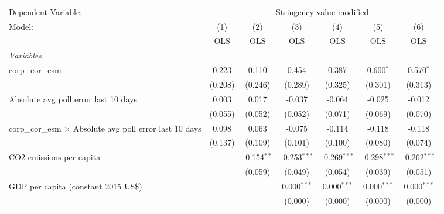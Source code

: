 
\begingroup
\centering
\begin{tabular}{lcccccc}
   \toprule
   Dependent Variable: & \multicolumn{6}{c}{Stringency value modified}\\
   Model:                                                          & (1)     & (2)           & (3)            & (4)            & (5)            & (6)\\  
                                                                   &  OLS    & OLS           & OLS            & OLS            & OLS            & OLS\\  
   \midrule
   \emph{Variables}\\
   corp\_cor\_esm                                                  & 0.223   & 0.110         & 0.454          & 0.387          & 0.600$^{*}$    & 0.570$^{*}$\\   
                                                                   & (0.208) & (0.246)       & (0.289)        & (0.325)        & (0.301)        & (0.313)\\   
   Absolute avg poll error last 10 days                            & 0.003   & 0.017         & -0.037         & -0.064         & -0.025         & -0.012\\   
                                                                   & (0.055) & (0.052)       & (0.052)        & (0.071)        & (0.069)        & (0.070)\\   
   corp\_cor\_esm $\times$ Absolute avg poll error last 10 days    & 0.098   & 0.063         & -0.075         & -0.114         & -0.118         & -0.118\\   
                                                                   & (0.137) & (0.109)       & (0.101)        & (0.100)        & (0.080)        & (0.074)\\   
   CO2 emissions per capita                                        &         & -0.154$^{**}$ & -0.253$^{***}$ & -0.269$^{***}$ & -0.298$^{***}$ & -0.262$^{***}$\\   
                                                                   &         & (0.059)       & (0.049)        & (0.054)        & (0.039)        & (0.051)\\   
   GDP per capita (constant 2015 US\$)                             &         &               & 0.000$^{***}$  & 0.000$^{***}$  & 0.000$^{***}$  & 0.000$^{***}$\\   
                                                                   &         &               & (0.000)        & (0.000)        & (0.000)        & (0.000)\\   

\end{tabular}
